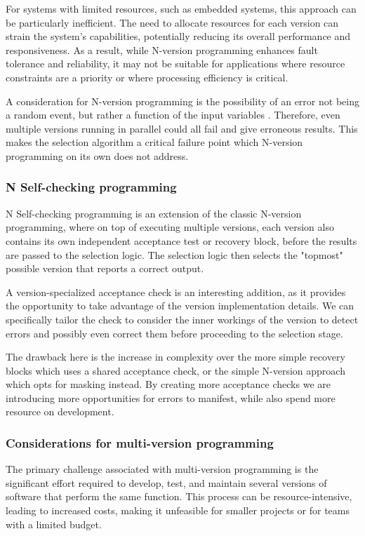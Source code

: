 For systems with limited resources, such as embedded systems, this approach can be particularly inefficient. The need to allocate resources for each version can strain the system's capabilities, potentially reducing its overall performance and responsiveness. As a result, while N-version programming enhances fault tolerance and reliability, it may not be suitable for applications where resource constraints are a priority or where processing efficiency is critical.

A consideration for N-version programming is the possibility of an error not being a random event, but rather a function of the input variables \cite{5326}. Therefore, even multiple versions running in parallel could all fail and give erroneous results. This makes the selection algorithm a critical failure point which N-version programming on its own does not address.

\subsubsection{N Self-checking programming}

N Self-checking programming is an extension of the classic N-version programming, where on top of executing multiple versions, each version also contains its own independent acceptance test or recovery block, before the results are passed to the selection logic. The selection logic then selects the "topmost" possible version that reports a correct output.

A version-specialized acceptance check is an interesting addition, as it provides the opportunity to take advantage of the version implementation details. We can specifically tailor the check to consider the inner workings of the version to detect errors and possibly even correct them before proceeding to the selection stage.

The drawback here is the increase in complexity over the more simple recovery blocks which uses a shared acceptance check, or the simple N-version approach which opts for masking instead. By creating more acceptance checks we are introducing more opportunities for errors to manifest, while also spend more resource on development.


\subsubsection{Considerations for multi-version programming}

The primary challenge associated with multi-version programming is the significant effort required to develop, test, and maintain several versions of software that perform the same function. This process can be resource-intensive, leading to increased costs, making it unfeasible for smaller projects or for teams with a limited budget.

